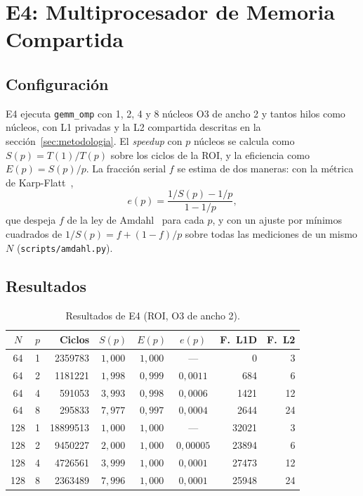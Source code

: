 \documentclass[journal]{IEEEtran}
\begin{document}
\section{E4: Multiprocesador de Memoria Compartida}
\label{sec:e4}

\subsection{Configuración}

E4 ejecuta \texttt{gemm\_omp} con 1, 2, 4 y 8 núcleos O3 de ancho 2 y
tantos hilos como núcleos, con L1 privadas y la L2 compartida descritas
en la sección~\ref{sec:metodologia}. El \textit{speedup} con $p$ núcleos
se calcula como $S(p) = T(1)/T(p)$ sobre los ciclos de la ROI, y la
eficiencia como $E(p) = S(p)/p$. La fracción serial $f$ se estima de
dos maneras: con la métrica de Karp-Flatt~\cite{karp1990},
\begin{equation}
  e(p) = \frac{1/S(p) - 1/p}{1 - 1/p},
  \label{eq:karpflatt}
\end{equation}
que despeja $f$ de la ley de Amdahl~\cite{amdahl1967} para cada $p$, y
con un ajuste por mínimos cuadrados de
$1/S(p) = f + (1-f)/p$ sobre todas las mediciones de un mismo $N$
(\texttt{scripts/amdahl.py}).

\subsection{Resultados}

\begin{table}[h]
\centering
\caption{Resultados de E4 (ROI, O3 de ancho 2).}
\label{tab:e4}
\footnotesize
\setlength{\tabcolsep}{2.5pt}
\begin{tabular}{|c|c|r|c|c|c|r|r|}
\hline
$N$ & $p$ & \textbf{Ciclos} & $S(p)$ & $E(p)$ & $e(p)$ &
\textbf{F.\ L1D} & \textbf{F.\ L2} \\ \hline
64  & 1 & \num{2359783} & $1{,}000$ & $1{,}000$ & ---      & 0          & 3  \\ \hline
64  & 2 & \num{1181221} & $1{,}998$ & $0{,}999$ & $0{,}0011$ & 684        & 6  \\ \hline
64  & 4 & \num{591053}  & $3{,}993$ & $0{,}998$ & $0{,}0006$ & \num{1421} & 12 \\ \hline
64  & 8 & \num{295833}  & $7{,}977$ & $0{,}997$ & $0{,}0004$ & \num{2644} & 24 \\ \hline
128 & 1 & \num{18899513} & $1{,}000$ & $1{,}000$ & ---      & \num{32021} & 3  \\ \hline
128 & 2 & \num{9450227}  & $2{,}000$ & $1{,}000$ & $0{,}00005$ & \num{23894} & 6  \\ \hline
128 & 4 & \num{4726561}  & $3{,}999$ & $1{,}000$ & $0{,}0001$ & \num{27473} & 12 \\ \hline
128 & 8 & \num{2363489}  & $7{,}996$ & $1{,}000$ & $0{,}0001$ & \num{25948} & 24 \\ \hline
\end{tabular}
\end{table}
\end{document}
